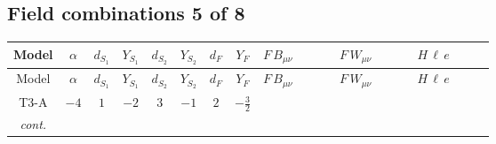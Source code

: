 \documentclass[8pt]{article}
\begin{document}
\begin{landscape}
\subsection*{Field combinations 5 of 8}
\begin{longtable}{@{}cccccccc >{\raggedright\arraybackslash}p{0.21\linewidth} >{\raggedright\arraybackslash}p{0.21\linewidth} >{\raggedright\arraybackslash}p{0.21\linewidth}@{}}
\toprule
Model & $\alpha$ & $d_{S_1}$ & $Y_{S_1}$ & $d_{S_2}$ & $Y_{S_2}$ & $d_F$ & $Y_F$ & $F\,B_{\mu\nu}$ & $F\,W_{\mu\nu}$ & $H\,\ell\,e$ \\
\midrule
\endfirsthead
\toprule
Model & $\alpha$ & $d_{S_1}$ & $Y_{S_1}$ & $d_{S_2}$ & $Y_{S_2}$ & $d_F$ & $Y_F$ & $F\,B_{\mu\nu}$ & $F\,W_{\mu\nu}$ & $H\,\ell\,e$ \\
\midrule
\endhead
T3-A & $-4$ & $1$ & $-2$ & $3$ & $-1$ & $2$ & $-\frac{3}{2}$ & \scriptsize\adjustbox{max width=\linewidth}{$\begin{gathered} -\frac{9}{2} \hbar  \log \left(\frac{\bar{\mu}^{2}}{M_F^2}\right) B_{\mu _1\mu _2}^2\end{gathered}$} & \scriptsize\adjustbox{max width=\linewidth}{$\begin{gathered} -\frac{1}{2} \hbar  \log \left(\frac{\bar{\mu}^{2}}{M_F^2}\right) \left(W_{\mu _1\mu _2}^{A_1}\right){}^2\end{gathered}$} & \scriptsize\adjustbox{max width=\linewidth}{$\begin{gathered} +\frac{\hbar  \overline{y_{1,i_3,r_1}} \overline{L_{a_1,i_2}}\, P_R\, e_{i_1} H_{a_1} y_{1,i_2,r_1} Y_{e,i_3,i_1}}{4 \epsilon } \\ +\frac{3}{8} \hbar  \overline{y_{1,i_3,r_1}} \overline{L_{a_1,i_2}}\, P_R\, e_{i_1} H_{a_1} y_{1,i_2,r_1} Y_{e,i_3,i_1} \\ +\frac{\sqrt{3} \hbar  \overline{y_{2,i_3,r_1}} \overline{L_{a_1,i_2}}\, P_R\, e_{i_1} H_{a_1} y_{2,i_2,r_1} Y_{e,i_3,i_1}}{4 \epsilon }\end{gathered}$} \\
\textit{cont.} &  &  &  &  &  &  &  &  &  & \scriptsize\adjustbox{max width=\linewidth}{$\begin{gathered} +\frac{3}{8} \sqrt{3} \hbar  \overline{y_{2,i_3,r_1}} \overline{L_{a_1,i_2}}\, P_R\, e_{i_1} H_{a_1} y_{2,i_2,r_1} Y_{e,i_3,i_1} \\ +\frac{\hbar  \overline{y_{1,i_1,r_1}} \overline{Y_{e,i_3,i_2}} \overline{e_{i_2}}\, P_L\, L_{a_1,i_1} y_{1,i_3,r_1} H_{a_1}{}^{\dagger }}{4 \epsilon } \\ +\frac{3}{8} \hbar  \overline{y_{1,i_1,r_1}} \overline{Y_{e,i_3,i_2}} \overline{e_{i_2}}\, P_L\, L_{a_1,i_1} y_{1,i_3,r_1} H_{a_1}{}^{\dagger }\end{gathered}$} \\

\end{longtable}
\end{landscape}
\end{document}
